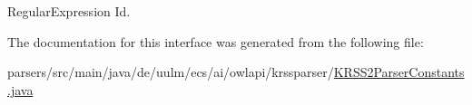 Regular\-Expression Id. 

The documentation for this interface was generated from the following file\-:\begin{DoxyCompactItemize}
\item 
parsers/src/main/java/de/uulm/ecs/ai/owlapi/krssparser/\hyperlink{_k_r_s_s2_parser_constants_8java}{K\-R\-S\-S2\-Parser\-Constants.\-java}\end{DoxyCompactItemize}
